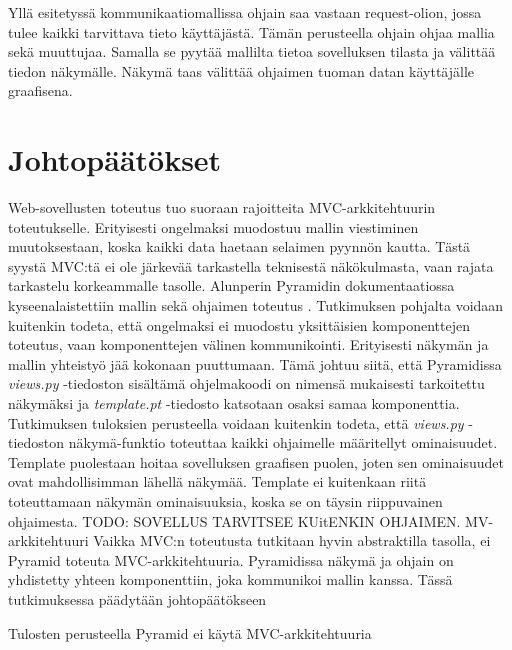 \documentclass[finnish,utf8,nonumbib,palatino,kandi]{gradu2}
\begin{document}
Yllä esitetyssä kommunikaatiomallissa ohjain saa vastaan request-olion, jossa tulee kaikki tarvittava tieto käyttäjästä. Tämän perusteella ohjain ohjaa mallia
sekä muuttujaa. Samalla se pyytää mallilta tietoa sovelluksen tilasta ja välittää tiedon näkymälle. Näkymä taas välittää ohjaimen tuoman datan käyttäjälle graafisena.


\section{Johtopäätökset}
Web-sovellusten toteutus tuo suoraan rajoitteita MVC-arkkitehtuurin toteutukselle. Erityisesti ongelmaksi muodostuu mallin viestiminen muutoksestaan, koska kaikki data haetaan selaimen pyynnön kautta. Tästä
syystä MVC:tä ei ole järkevää tarkastella teknisestä näkökulmasta, vaan rajata tarkastelu korkeammalle tasolle.
Alunperin Pyramidin dokumentaatiossa kyseenalaistettiin mallin sekä ohjaimen toteutus \cite{Pyramid:intr}. Tutkimuksen pohjalta voidaan kuitenkin
todeta, että ongelmaksi ei muodostu yksittäisien komponenttejen toteutus, vaan komponenttejen välinen kommunikointi. Erityisesti näkymän ja mallin yhteistyö jää
kokonaan puuttumaan. Tämä johtuu siitä, että Pyramidissa \emph{views.py} -tiedoston sisältämä ohjelmakoodi on nimensä mukaisesti tarkoitettu näkymäksi ja
\emph{template.pt} -tiedosto katsotaan osaksi samaa komponenttia. Tutkimuksen tuloksien perusteella voidaan kuitenkin todeta, että \emph{views.py} -tiedoston näkymä-funktio toteuttaa kaikki
ohjaimelle määritellyt ominaisuudet. Template puolestaan hoitaa sovelluksen graafisen puolen, joten sen ominaisuudet ovat mahdollisimman lähellä näkymää. Template ei kuitenkaan riitä toteuttamaan näkymän ominaisuuksia,
koska se on täysin riippuvainen ohjaimesta. TODO: SOVELLUS TARVITSEE KUitENKIN OHJAIMEN. MV-arkkitehtuuri
Vaikka MVC:n toteutusta tutkitaan hyvin abstraktilla tasolla, ei Pyramid toteuta MVC-arkkitehtuuria. Pyramidissa näkymä ja ohjain on yhdistetty yhteen komponenttiin, joka kommunikoi mallin kanssa. Tässä tutkimuksessa
päädytään johtopäätökseen


Tulosten perusteella Pyramid ei käytä MVC-arkkitehtuuria
\end{document}

